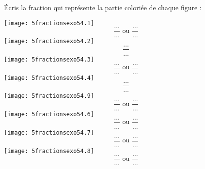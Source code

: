 \'Ecris la fraction qui représente la partie coloriée de chaque figure :
\begin{multicols}{8}
\texttt{[image: 5fractionsexo54.1]} \[\frac{\ldots}{\ldots}\mbox{ ou } \frac{\ldots}{\ldots}\]
\texttt{[image: 5fractionsexo54.2]} \[\frac{\ldots}{\ldots}\]
\texttt{[image: 5fractionsexo54.3]} \[\frac{\ldots}{\ldots}\mbox{ ou } \frac{\ldots}{\ldots}\]
\texttt{[image: 5fractionsexo54.4]} \[\frac{\ldots}{\ldots}\]
\texttt{[image: 5fractionsexo54.9]} \[\frac{\ldots}{\ldots}\mbox{ ou } \frac{\ldots}{\ldots}\]
\texttt{[image: 5fractionsexo54.6]} \[\frac{\ldots}{\ldots}\mbox{ ou } \frac{\ldots}{\ldots}\]
\texttt{[image: 5fractionsexo54.7]} \[\frac{\ldots}{\ldots}\mbox{ ou } \frac{\ldots}{\ldots}\]
\texttt{[image: 5fractionsexo54.8]} \[\frac{\ldots}{\ldots}\mbox{ ou } \frac{\ldots}{\ldots}\]
\end{multicols}